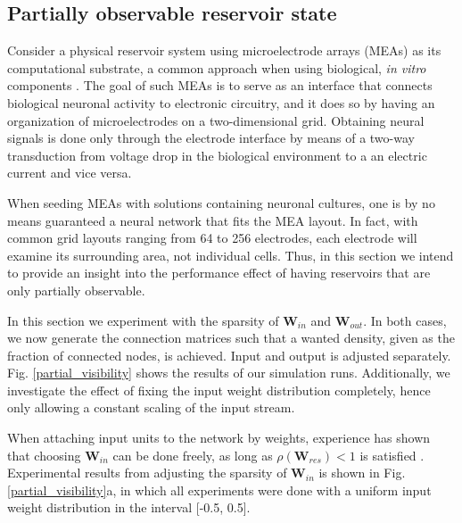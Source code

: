 \subsection{Partially observable reservoir state}

Consider a physical reservoir system using microelectrode arrays (MEAs) as its
computational substrate, a common approach when using biological, \textit{in
vitro} components \cite{aaser_towards_2017}. The goal of such MEAs is to serve
as an interface that connects biological neuronal activity to electronic
circuitry, and it does so by having an organization of microelectrodes on a
two-dimensional grid. Obtaining neural signals is done only through the
electrode interface by means of a two-way transduction from voltage drop in the
biological environment to a an electric current and vice versa.

When seeding MEAs with solutions containing neuronal cultures, one is by no
means guaranteed a neural network that fits the MEA layout. In fact, with common
grid layouts ranging from 64 to 256 electrodes, each electrode will examine its
surrounding area, not individual cells. Thus, in this section we intend to
provide an insight into the performance effect of having reservoirs that are
only partially observable.

In this section we experiment with the sparsity of $\mathbf{W}_{in}$ and
$\mathbf{W}_{out}$. In both cases, we now generate the connection matrices such
that a wanted density, given as the fraction of connected nodes, is
achieved. Input and output is adjusted separately. Fig. \ref{partial_visibility}
shows the results of our simulation runs. Additionally, we investigate the
effect of fixing the input weight distribution completely, hence only allowing a
constant scaling of the input stream.

When attaching input units to the network by weights, experience has shown that
choosing $\mathbf{W}_{in}$ can be done freely, as long as
$\rho(\mathbf{W}_{res}) < 1$ is satisfied \cite{jaeger_echo_2001}. Experimental
results from adjusting the sparsity of $\mathbf{W}_{in}$ is shown in
Fig. \ref{partial_visibility}a, in which all experiments were done with a
uniform input weight distribution in the interval [-0.5, 0.5].

